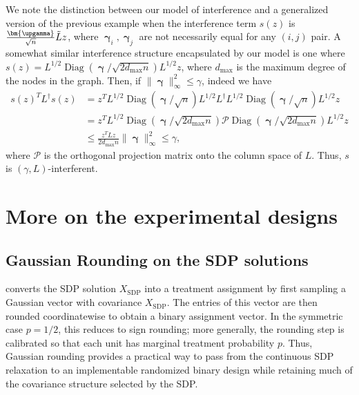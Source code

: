 \documentclass[12pt]{article}
\theoremstyle{definition}
\numberwithin{equation}{section}
\numberwithin{figure}{section}
\newcommand{\Diag}{\operatorname{Diag}}
\numberwithin{equation}{section}
\numberwithin{figure}{section}
\begin{document}
\begin{example}
We note the distinction between our model of interference and a generalized version of the previous example when the interference term $s(z)$ is $ \frac{\bm{\upgamma}}{\sqrt{n}} \Tilde{L} z$, where $\bm{\upgamma}_i, \bm{\upgamma}_j$ are not necessarily equal for any $(i,j)$ pair. A somewhat similar interference structure encapsulated by our model is one where
$s(z) = L^{1/2} \Diag(\bm{\upgamma} / \sqrt{2 d_{\text{max}} n}) L^{1/2} z$, where $d_{\text{max}}$ is the maximum degree of the nodes in the graph. Then, if $\|\bm{\upgamma}\|_\infty^2 \leq \gamma$, indeed we have
\begin{align*}
    s(z)^T L^\dagger s(z) &= z^T L^{1/2} \Diag(\bm{\upgamma} / \sqrt{n}) L^{1/2} L^\dagger L^{1/2} \Diag(\bm{\upgamma} / \sqrt{n}) L^{1/2} z \\
    &= z^T L^{1/2} \Diag(\bm{\upgamma} / \sqrt{2 d_{\text{max}} n}) \mathcal{P} \Diag(\bm{\upgamma} / \sqrt{2 d_{\text{max}} n}) L^{1/2} z \\
    &\leq \frac{z^T L z}{2 d_{\text{max}} n} \| \bm{\upgamma} \|_{\infty}^2 \leq \gamma,
\end{align*} where $\mathcal{P}$ is the orthogonal projection matrix onto the column space of $L$. Thus, $s$ is $(\gamma, L)$-interferent. 
\end{example}

\section{More on the experimental designs}

\subsection{Gaussian Rounding on the SDP solutions}

 converts the SDP solution \(X_{\text{SDP}}\) into a treatment assignment by first sampling a Gaussian vector with covariance $X_{\text{SDP}}$. The entries of this vector are then rounded coordinatewise to obtain a binary assignment vector. In the symmetric case \(p=1/2\), this reduces to sign rounding; more generally, the rounding step is calibrated so that each unit has marginal treatment probability \(p\). Thus, Gaussian rounding provides a practical way to pass from the continuous SDP relaxation to an implementable randomized binary design while retaining much of the covariance structure selected by the SDP.
\end{document}
